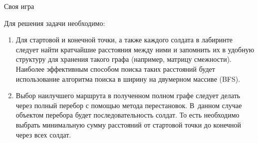 \begin{tutorial}{Своя игра}

Для решения задачи необходимо:
\begin{enumerate}
\item Для стартовой и конечной точки, а также каждого солдата в лабиринте следует найти кратчайшие расстояния между ними и запомнить их в удобную структуру для хранения такого графа (например, матрицу смежности). Наиболее эффективным способом поиска таких расстояний будет использование алгоритма поиска в ширину на двумерном массиве (BFS).
\item Выбор наилучшего маршрута в полученном полном графе следует делать через полный перебор с помощью метода перестановок. В~данном случае объектом перебора будет последовательность солдат. То есть необходимо выбрать минимальную сумму расстояний от стартовой точки до конечной через всех солдат.
\end{enumerate}

\end{tutorial}
